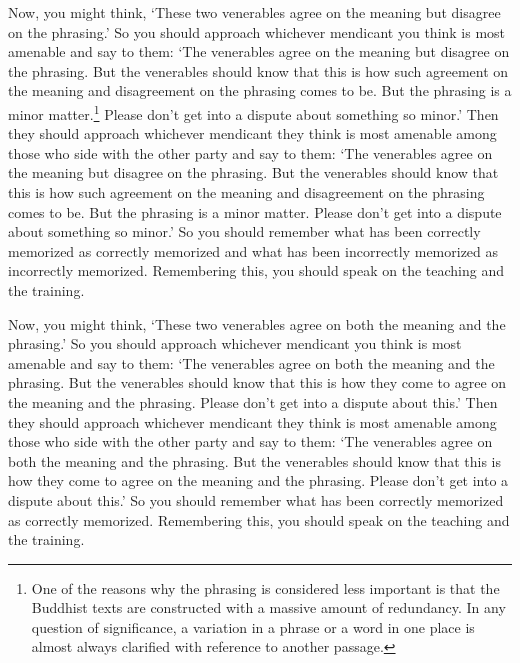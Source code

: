 \documentclass[12pt,openany]{book}%
\begin{document}
Now, you might think, ‘These two venerables agree on the meaning but disagree on the phrasing.’ So you should approach whichever mendicant you think is most amenable and say to them: ‘The venerables agree on the meaning but disagree on the phrasing. But the venerables should know that this is how such agreement on the meaning and disagreement on the phrasing comes to be. But the phrasing is a minor matter.\footnote{One of the reasons why the phrasing is considered less important is that the Buddhist texts are constructed with a massive amount of redundancy. In any question of significance, a variation in a phrase or a word in one place is almost always clarified with reference to another passage. } Please don’t get into a dispute about something so minor.’ Then they should approach whichever mendicant they think is most amenable among those who side with the other party and say to them: ‘The venerables agree on the meaning but disagree on the phrasing. But the venerables should know that this is how such agreement on the meaning and disagreement on the phrasing comes to be. But the phrasing is a minor matter. Please don’t get into a dispute about something so minor.’ So you should remember what has been correctly memorized as correctly memorized and what has been incorrectly memorized as incorrectly memorized. Remembering this, you should speak on the teaching and the training. 

Now, you might think, ‘These two venerables agree on both the meaning and the phrasing.’ So you should approach whichever mendicant you think is most amenable and say to them: ‘The venerables agree on both the meaning and the phrasing. But the venerables should know that this is how they come to agree on the meaning and the phrasing. Please don’t get into a dispute about this.’ Then they should approach whichever mendicant they think is most amenable among those who side with the other party and say to them: ‘The venerables agree on both the meaning and the phrasing. But the venerables should know that this is how they come to agree on the meaning and the phrasing. Please don’t get into a dispute about this.’ So you should remember what has been correctly memorized as correctly memorized. Remembering this, you should speak on the teaching and the training. 
\end{document}
